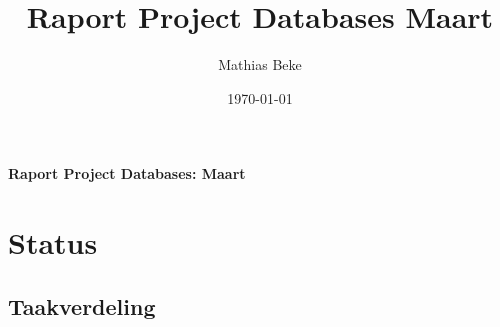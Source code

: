 \documentclass[11pt]{article}
\title{Raport Project Databases Maart}
\author{Mathias Beke}
\date{\today}
\begin{document}
\rhead{}

  \begin{center}
      \Large\textbf{Raport Project Databases: Maart}
   \end{center}





\section{Status}




\subsection{Taakverdeling}
\end{document}
